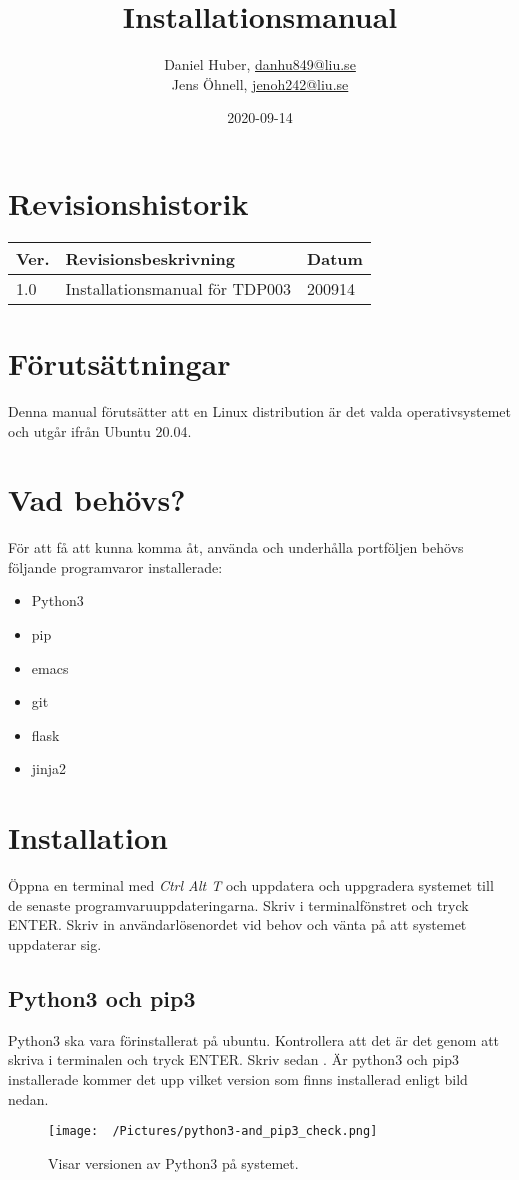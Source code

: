 \documentclass{TDP003mall}
\author{Daniel Huber, \url{danhu849@liu.se}\\
  Jens Öhnell, \url{jenoh242@liu.se}}
\title{Installationsmanual}
\date{2020-09-14}
\begin{document}
\projectpage
\section{Revisionshistorik}
\begin{table}[!h]
\begin{tabularx}{\linewidth}{|l|X|l|}
\hline
Ver. & Revisionsbeskrivning & Datum \\\hline
1.0 & Installationsmanual för TDP003 & 200914 \\\hline
\end{tabularx}
\end{table}

\section{Förutsättningar}
Denna manual förutsätter att en Linux distribution är det valda operativsystemet och utgår ifrån Ubuntu 20.04.

\section{Vad behövs?}
För att få att kunna komma åt, använda och underhålla portföljen behövs följande programvaror installerade:
\begin{itemize}
  \item Python3
  \item pip
  \item emacs
  \item git
  \item flask
  \item jinja2   
\end{itemize}

\section{Installation}
Öppna en terminal med \emph{Ctrl Alt T} och uppdatera och uppgradera systemet till de senaste programvaruuppdateringarna. Skriv  i terminalfönstret och tryck ENTER. Skriv in användarlösenordet vid behov och vänta på att systemet uppdaterar sig.

\subsection{Python3 och pip3}
Python3 ska vara förinstallerat på ubuntu. Kontrollera att det är det genom att skriva  i terminalen och tryck ENTER. Skriv sedan . Är python3 och pip3 installerade kommer det upp vilket version som finns installerad enligt bild nedan.
\begin{figure}[htbp]
  \centerline{\texttt{[image: ~/Pictures/python3-and\_pip3\_check.png]}}
  \caption{Visar versionen av Python3 på systemet.}
  \label{fig}
\end{figure}
\end{document}
